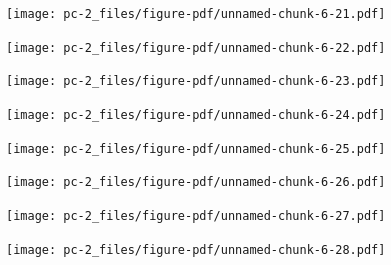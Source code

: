 \documentclass[
  letterpaper,
  DIV=11,
  numbers=noendperiod]{scrreprt}
\begin{document}
\begin{figure}[H]

{\centering \texttt{[image: pc-2\_files/figure-pdf/unnamed-chunk-6-21.pdf]}

}

\end{figure}

\begin{figure}[H]

{\centering \texttt{[image: pc-2\_files/figure-pdf/unnamed-chunk-6-22.pdf]}

}

\end{figure}

\begin{figure}[H]

{\centering \texttt{[image: pc-2\_files/figure-pdf/unnamed-chunk-6-23.pdf]}

}

\end{figure}

\begin{figure}[H]

{\centering \texttt{[image: pc-2\_files/figure-pdf/unnamed-chunk-6-24.pdf]}

}

\end{figure}

\begin{figure}[H]

{\centering \texttt{[image: pc-2\_files/figure-pdf/unnamed-chunk-6-25.pdf]}

}

\end{figure}

\begin{figure}[H]

{\centering \texttt{[image: pc-2\_files/figure-pdf/unnamed-chunk-6-26.pdf]}

}

\end{figure}

\begin{figure}[H]

{\centering \texttt{[image: pc-2\_files/figure-pdf/unnamed-chunk-6-27.pdf]}

}

\end{figure}

\begin{figure}[H]

{\centering \texttt{[image: pc-2\_files/figure-pdf/unnamed-chunk-6-28.pdf]}

}

\end{figure}
\end{document}
